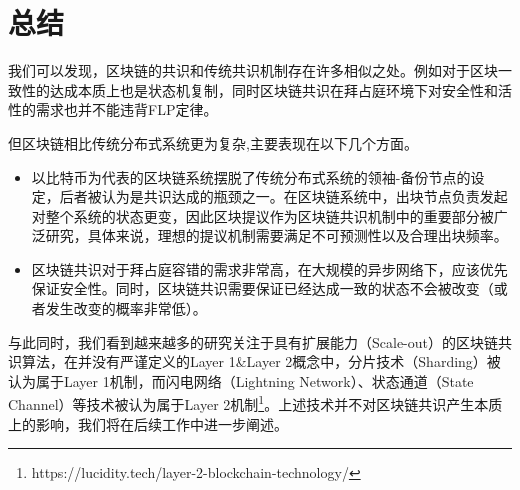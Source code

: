 \section{总结}
我们可以发现，区块链的共识和传统共识机制存在许多相似之处。例如对于区块一致性的达成本质上也是状态机复制，同时区块链共识在拜占庭环境下对安全性和活性的需求也并不能违背FLP定律。

但区块链相比传统分布式系统更为复杂,主要表现在以下几个方面。

\begin{itemize}
	\item 以比特币为代表的区块链系统摆脱了传统分布式系统的领袖-备份节点的设定，后者被认为是共识达成的瓶颈之一\cite{howard2019consensus}。在区块链系统中，出块节点负责发起对整个系统的状态更变，因此区块提议作为区块链共识机制中的重要部分被广泛研究，具体来说，理想的提议机制需要满足不可预测性以及合理出块频率。%
	\item 区块链共识对于拜占庭容错的需求非常高，在大规模的异步网络下，应该优先保证安全性。同时，区块链共识需要保证已经达成一致的状态不会被改变（或者发生改变的概率非常低）。
\end{itemize}

与此同时，我们看到越来越多的研究关注于具有扩展能力（Scale-out）的区块链共识算法，在并没有严谨定义的Layer 1\&Layer 2概念中，分片技术（Sharding）被认为属于Layer 1机制，而闪电网络（Lightning Network）、状态通道（State Channel）等技术被认为属于Layer 2机制\footnote{https://lucidity.tech/layer-2-blockchain-technology/}。上述技术并不对区块链共识产生本质上的影响，我们将在后续工作中进一步阐述。

